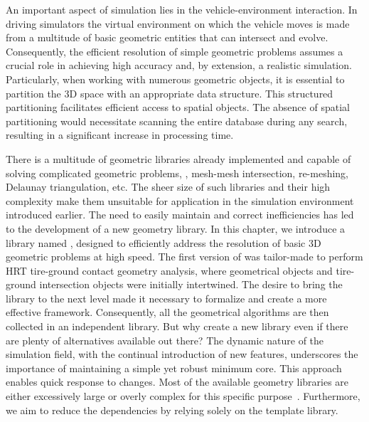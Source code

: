 An important aspect of simulation lies in the vehicle-environment interaction. In driving simulators the virtual environment on which the vehicle moves is made from a multitude of basic geometric entities that can intersect and evolve. Consequently, the efficient resolution of simple geometric problems assumes a crucial role in achieving high accuracy and, by extension, a realistic simulation. Particularly, when working with numerous geometric objects, it is essential to partition the \ac{3D} space with an appropriate data structure. This structured partitioning facilitates efficient access to spatial objects. The absence of spatial partitioning would necessitate scanning the entire database during any search, resulting in a significant increase in processing time.

There is a multitude of geometric libraries already implemented and capable of solving complicated geometric problems, \eg{}, mesh-mesh intersection, re-meshing, Delaunay triangulation, etc. The sheer size of such libraries and their high complexity make them unsuitable for application in the simulation environment introduced earlier. The need to easily maintain and correct inefficiencies has led to the development of a new geometry library. In this chapter, we introduce a \cpp{} library named \Acme{}, designed to efficiently address the resolution of basic \ac{3D} geometric problems at high speed. The first version of \Acme{} was tailor-made to perform \ac{HRT} tire-ground contact geometry analysis, where geometrical objects and tire-ground intersection objects were initially intertwined. The desire to bring the library to the next level made it necessary to formalize and create a more effective framework. Consequently, all the geometrical algorithms are then collected in an independent library. But why create a new library even if there are plenty of alternatives available out there? The dynamic nature of the simulation field, with the continual introduction of new features, underscores the importance of maintaining a simple yet robust minimum core. This approach enables quick response to changes. Most of the available geometry libraries are either excessively large or overly complex for this specific purpose~\cite{cgal2023cgal, libigl2018libigl}. Furthermore, we aim to reduce the dependencies by relying solely on the \cpp{} \Eigen{} template library. %

